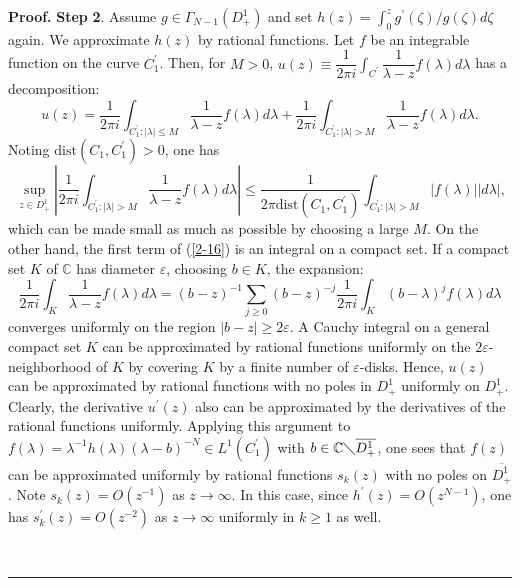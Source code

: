 \documentclass[a4paper]{article}%
\newenvironment{proof}[1][Proof]{\noindent\textbf{#1.} }{\ \rule{0.5em}{0.5em}}
\begin{document}
\begin{proof}
\textbf{Step} \textbf{2}. Assume $g\in\Gamma_{N-1}\left(  D_{+}^{1}\right)  $
and set $h\left(  z\right)  =\int_{0}^{z}g^{\prime}\left(  \zeta\right)
/g\left(  \zeta\right)  d\zeta$ again. We approximate $h(z)$ by rational
functions. Let $f$ be an integrable function on the curve $C_{1}^{\prime}$.
Then, for $M>0$, $u\left(  z\right)  \equiv\dfrac{1}{2\pi i}\int_{C^{\prime}%
}\dfrac{1}{\lambda-z}f\left(  \lambda\right)  d\lambda$ has a decomposition:%
\begin{equation}
u\left(  z\right)  =\dfrac{1}{2\pi i}\int_{C_{1}^{\prime}:\left\vert
\lambda\right\vert \leq M}\dfrac{1}{\lambda-z}f\left(  \lambda\right)
d\lambda+\dfrac{1}{2\pi i}\int_{C_{1}^{\prime}:\left\vert \lambda\right\vert
>M}\dfrac{1}{\lambda-z}f\left(  \lambda\right)  d\lambda\text{.} \label{2-16}%
\end{equation}
Noting $\mathrm{dist}\left(  C_{1},C_{1}^{\prime}\right)  >0$, one has%
\[
\sup_{z\in D_{+}^{1}}\left\vert \dfrac{1}{2\pi i}\int_{C_{1}^{\prime
}:\left\vert \lambda\right\vert >M}\dfrac{1}{\lambda-z}f\left(  \lambda
\right)  d\lambda\right\vert \leq\dfrac{1}{2\pi\mathrm{dist}\left(
C_{1},C_{1}^{\prime}\right)  }\int_{C_{1}^{\prime}:\left\vert \lambda
\right\vert >M}\left\vert f\left(  \lambda\right)  \right\vert \left\vert
d\lambda\right\vert \text{,}%
\]
which can be made small as much as possible by choosing a large $M$. On the
other hand, the first term of (\ref{2-16}) is an integral on a compact set. If
a compact set $K$ of $\mathbb{C}$ has diameter $\varepsilon$, choosing $b\in
K$, the expansion:%
\[
\dfrac{1}{2\pi i}\int_{K}\dfrac{1}{\lambda-z}f\left(  \lambda\right)
d\lambda=\left(  b-z\right)  ^{-1}\sum_{j\geq0}\left(  b-z\right)  ^{-j}%
\dfrac{1}{2\pi i}\int_{K}\left(  b-\lambda\right)  ^{j}f\left(  \lambda
\right)  d\lambda
\]
converges uniformly on the region $\left\vert b-z\right\vert \geq2\varepsilon
$. A Cauchy integral on a general compact set $K$ can be approximated by
rational functions uniformly on the $2\varepsilon$-neighborhood of $K$ by
covering $K$ by a finite number of $\varepsilon$-disks. Hence, $u(z)$ can be
approximated by rational functions with no poles in $D_{+}^{1}$ uniformly on
$D_{+}^{1}$. Clearly, the derivative $u^{\prime}(z)$ also can be approximated
by the derivatives of the rational functions uniformly. Applying this argument
to $f(\lambda)=\lambda^{-1}h\left(  \lambda\right)  \left(  \lambda-b\right)
^{-N}\in L^{1}\left(  C_{1}^{\prime}\right)  $ with $b\in\mathbb{C}%
\diagdown\overline{D_{+}^{1}}$, one sees that $f\left(  z\right)  $ can be
approximated uniformly by rational functions $s_{k}(z)$ with no poles on
$\overline{D_{+}^{1}}$. Note $s_{k}(z)=O\left(  z^{-1}\right)  $ as
$z\rightarrow\infty$. In this case, since $h^{\prime}\left(  z\right)
=O\left(  z^{N-1}\right)  $, one has $s_{k}^{\prime}(z)=O\left(
z^{-2}\right)  $ as $z\rightarrow\infty$ uniformly in $k\geq1$ as well.


\end{proof}
\end{document}

